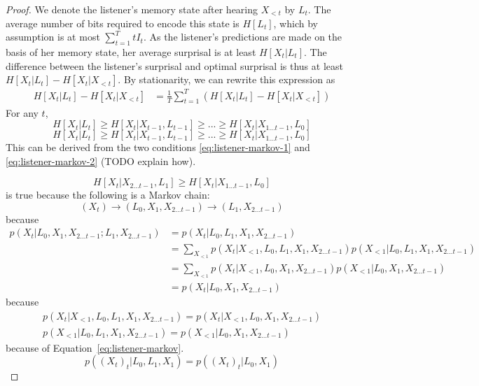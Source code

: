 \documentclass[11pt,letterpaper]{article}
\begin{document}
\begin{proof}
We denote the listener's memory state after hearing $X_{<t}$ by $L_t$.
The average number of bits required to encode this state is $H[L_t]$, which by assumption is at most $\sum_{t=1}^T t I_t$.
As the listener's predictions are made on the basis of her memory state, her average surprisal is at least $H[X_t | L_t]$.
The difference between the listener's surprisal and optimal surprisal is thus at least $H[X_t | L_t] - H[X_t | X_{<t}]$.
By stationarity, we can rewrite this expression as
\begin{align*}
	H[X_t | L_t] - H[X_t | X_{<t}] &=  \frac{1}{T} \sum_{t=1}^{T} \left(H[X_t | L_t] - H[X_t | X_{<t}]\right) 
\end{align*}
For any $t$,
	$$H[X_t | L_t] \geq H[X_t| X_{t-1}, L_{t-1}] \geq ... \geq H[X_t|X_{1 \dots t-1}, L_0]$$
	\begin{equation}
H[X_t | L_t] \geq H[X_t| X_{t-1}, L_{t-1}] \geq ... \geq H[X_t|X_{1 \dots t-1}, L_0]
		\end{equation}
	This can be derived from the two conditions \ref{eq:listener-markov-1} and \ref{eq:listener-markov-2} (TODO explain how).

	\begin{equation}
H[X_t| X_{2 \dots t-1}, L_{1}] \geq H[X_t|X_{1 \dots t-1}, L_0]
	\end{equation}
is true because the following is a Markov chain:
\begin{equation}
(X_t) \rightarrow (L_0, X_1, X_{2 \dots t-1})   \rightarrow   (L_1, X_{2 \dots t-1})
\end{equation}
because
\begin{align*}
p(X_t|L_0, X_1, X_{2 \dots t-1}; L_1, X_{2 \dots t-1}) & = p(X_t|L_0, L_1, X_1, X_{2 \dots t-1}) \\
& = \sum_{X_{<1}} p(X_t|X_{<1}, L_0, L_1, X_1, X_{2 \dots t-1}) p(X_{<1}| L_0, L_1, X_1, X_{2 \dots t-1}) \\
&= \sum_{X_{<1}} p(X_t|X_{<1}, L_0,  X_1, X_{2 \dots t-1}) p(X_{<1}| L_0, X_1, X_{2 \dots t-1}) \\
&= p(X_t|L_0,  X_1, X_{2 \dots t-1}) 
\end{align*}
because
	\begin{align*}
p(X_t|X_{<1}, L_0, L_1, X_1, X_{2 \dots t-1}) = p(X_t|X_{<1}, L_0,  X_1, X_{2 \dots t-1}) \\
p(X_{<1}| L_0, L_1, X_1, X_{2 \dots t-1})   = p(X_{<1}| L_0, X_1, X_{2 \dots t-1})
	\end{align*}
because of Equation~\ref{eq:listener-markov}.
	\begin{equation}
p((X_{t})_t| L_0, L_1, X_1)   = p((X_{t})_t| L_0, X_1)
	\end{equation}


\end{proof}
\end{document}
